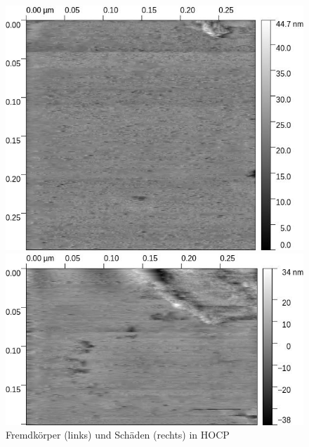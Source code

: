 \documentclass[12pt,a4paper]{scrartcl}
\numberwithin{equation}{section} %
\begin{document}
\begin{figure}[h!]
	\begin{minipage}{\textwidth}
		\begin{minipage}[T]{0.5\textwidth}
			\includegraphics[width=\textwidth]{../media/B2.5/Graphit_3.jpg}
		\end{minipage}
		\begin{minipage}[T]{0.5\textwidth}
			\includegraphics[width=\textwidth]{../media/B2.5/Graphit_1.jpg}
		\end{minipage}
		\caption{Fremdkörper (links) und Schäden (rechts) in HOCP}
		\label{abb:hocp own: Fremdkörper}
	\end{minipage}
	\begin{minipage}{\textwidth}
		\begin{minipage}[t]{0.5\textwidth}

\end{minipage}
\end{minipage}
\end{figure}
\end{document}
